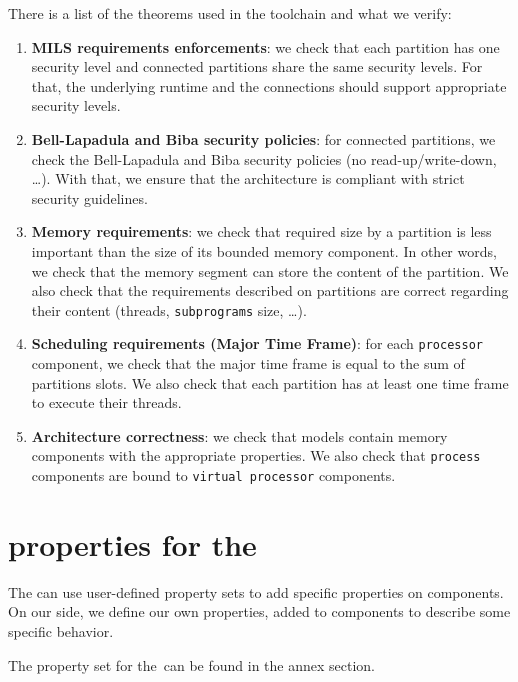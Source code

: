    There is a list of the theorems used in the \pok toolchain and what we
   verify:
   \begin{enumerate}
      \item
         \textbf{MILS requirements enforcements}: we check that each partition
         has one security level and connected partitions share the same security
         levels. For that, the underlying runtime and the connections should
         support appropriate security levels.
      \item
         \textbf{Bell-Lapadula and Biba security policies}: for connected
         partitions, we check the Bell-Lapadula and Biba security policies (no
         read-up/write-down, \ldots). With that, we ensure that the architecture
         is compliant with strict security guidelines.
      \item
         \textbf{Memory requirements}: we check that required size by a
         partition is less important than the size of its bounded memory
         component. In other words, we check that the memory segment can store
         the content of the partition. We also check that the requirements
         described on partitions are correct regarding their content (threads,
         \texttt{subprograms} size, \ldots).
      \item
         \textbf{Scheduling requirements (Major Time Frame)}: for each
         \texttt{processor} component, we check that the major time frame is
         equal to the sum of partitions slots. We also check that each partition
         has at least one time frame to execute their threads.
      \item
         \textbf{Architecture correctness}: we check that models contain memory
         components with the appropriate properties. We also check that
         \texttt{process} components are bound to \texttt{virtual processor}
         components.
   \end{enumerate}

   \section{\pok properties for the \aadl}
   The \aadl can use user-defined property sets to add specific properties on
   \aadl components. On our side, we define our own \aadl properties, added to
   \aadl components to describe some specific behavior.

   The \pok property set for the \aadl can be found in the annex section.


